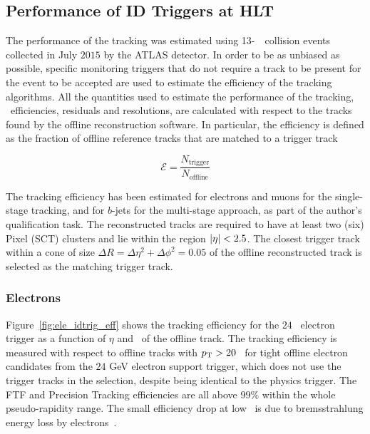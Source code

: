 			\subsection{Performance of ID Triggers at HLT}
			\label{sec:Trig_perf_HLT}

				The performance of the tracking was estimated using 13-\TeV\ \pp\ collision events collected in July $2015$ by the \ac{ATLAS} detector. In order to be as unbiased as possible, specific monitoring triggers that do not require a track to be present for the event to be accepted are used to estimate the efficiency of the tracking algorithms. All the quantities used to estimate the performance of the tracking, \ie\ efficiencies, residuals and resolutions, are calculated with respect to the tracks found by the offline reconstruction software. In particular, the efficiency is defined as the fraction of offline reference tracks that are matched to a trigger track 

				\begin{equation}
					\mathcal{E} = \frac{N_{\mathrm{trigger}}}{N_{\mathrm{offline}}}
					\label{eq:trig_eff}
				\end{equation}

				The tracking efficiency has been estimated for electrons and muons for the single-stage tracking, and for $b$-jets for the multi-stage approach, as part of the author's qualification task. The reconstructed tracks are required to have at least two (six) Pixel (\ac{SCT}) clusters and lie within the region $|\eta| < 2.5$. The closest trigger track within a cone of size $\Delta R =  \Delta \eta^2 + \Delta \phi^2 = 0.05$ of the offline reconstructed track is selected as the matching trigger track.


				\subsubsection*{Electrons}

					Figure~\ref{fig:ele_idtrig_eff} shows the tracking efficiency for the $24$ \GeV\ electron trigger as a function of $\eta$ and \pt\ of the offline track. The tracking efficiency is measured with respect to offline tracks with $p_{\mathrm{T}} > 20$ \GeV\ for tight offline electron candidates from the $24$ GeV electron support trigger, which does not use the trigger tracks in the selection, despite being identical to the physics trigger. The \ac{FTF} and Precision Tracking efficiencies are all above $99\%$ within the whole pseudo-rapidity range. The small efficiency drop at low \pt\ is due to bremsstrahlung energy loss by electrons~\cite{ATLASTrigger2015}.

